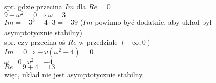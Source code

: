 \noindent\\
spr. gdzie przecina $Im$ dla $Re=0$\\
$9-\omega^2=0\Rightarrow\omega=3$\\
$Im=-3^3-4\cdot 3=-39$ {\color{lightgray} ($Im$ powinno być dodatnie, aby układ był asymptotycznie stabilny)}\\
spr. czy przecina oś $Re$ w przedziale $(-\infty, 0)$\\
$Im=0\Rightarrow -\omega(\omega^2+4)=0$\\
$\omega=0 \ \ \ \omega^2=-4$\\
$Re=9+4=13$\\
więc, układ nie jest asymptotycznie stabilny.


